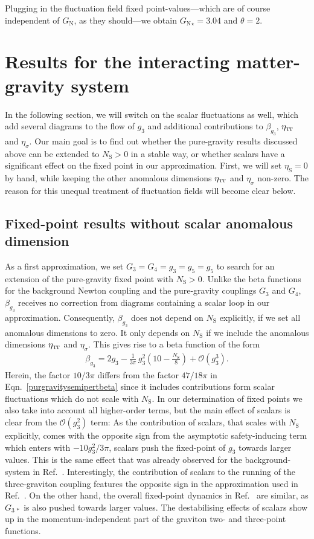 \documentclass[11pt]{book}
\newcommand\TTspace{ -1pt }
\newcommand\etaTT{ \eta_{\scriptscriptstyle{\mathrm{T\hspace{\TTspace}T}}} }
\newcommand\etaS{ \eta_{\scriptscriptstyle{\mathrm{S}}} }
\newcommand\NS{ N_{\scriptscriptstyle{\mathrm{S}}} }
\newcommand\GNewton{ G_{\scriptscriptstyle{\mathrm{N}}}{} }
\newcommand\Gback{ \GNewton } %
\numberwithin{equation}{chapter}
\begin{document}
Plugging in the fluctuation field fixed point-values---which are of course independent
of $\Gback$, as they should---we obtain $\Gback_{\star} = 3.04$ and $\theta=2$.


\section{Results for the interacting matter-gravity system}

In the following section, we will switch on the scalar fluctuations as well,
which add several diagrams to the flow of $g_3$ and additional contributions to
$\beta_{g_3}$, $\etaTT$ and $\eta_{\sigma}$.
Our main goal is to find out whether the pure-gravity results discussed above can be
extended to $\NS>0$ in a stable way,
or whether scalars have a significant effect on the fixed point in our approximation.
First, we will set $\etaS=0$ by hand, while keeping the other anomalous dimensions
$\etaTT$ and $\eta_{\sigma}$ non-zero.
The reason for this unequal treatment of fluctuation fields will become clear below.


\subsection{Fixed-point results without scalar anomalous dimension}

As a first approximation, we set $G_3=G_4=g_3=g_5=g_5$
to search for an extension of the pure-gravity fixed point with $\NS>0$.
Unlike the beta functions for the background Newton coupling and the pure-gravity
couplings $G_3$ and $G_4$, $\beta_{g_3}$ receives no correction from diagrams containing
a scalar loop  in our approximation.
Consequently, $\beta_{g_3}$ does not depend on $\NS$ explicitly, if we set all anomalous dimensions to zero.
It only depends on $\NS$ if we include the anomalous dimensions $\etaTT$ and $\eta_{\sigma}$.
This gives rise to a beta function of the form
\begin{align}
  \beta_{g_3} = 2 g_3 - \frac{1}{3\pi} \, g_3^2 \left( 10-\frac{\NS}{8} \right) + \mathcal{O}(g_3^3).
  \label{norma}
\end{align}
Herein, the factor $10/3\pi$ differs from the  factor $47/18\pi$ in
Eqn.~\eqref{purgravitysemipertbeta} since it includes contributions form scalar fluctuations
which do not scale with $\NS$.
In our determination of fixed points we also take into account all higher-order terms,
but the main effect of scalars is clear from the $\mathcal{O}(g_3^2)$ term:
As the contribution of scalars, that scales with $\NS$ explicitly,
comes with the opposite sign from the asymptotic safety-inducing term which enters with $-10g_3^2/3\pi$,
scalars push the fixed-point of $g_3$ towards larger values.
This is the same effect that was already observed for the background-system in Ref.~\cite{Dona:2013qba}.
Interestingly, the contribution of scalars to the running of the three-graviton coupling features
the opposite sign in the approximation used in Ref.~\cite{Meibohm:2015twa}.
On the other hand, the overall fixed-point dynamics in Ref.~\cite{Meibohm:2015twa} are similar,
as $G_{3\,\ast}$ is also pushed towards larger values.
The destabilising effects of scalars show up in the momentum-independent part of the
graviton two- and three-point functions.
\end{document}
